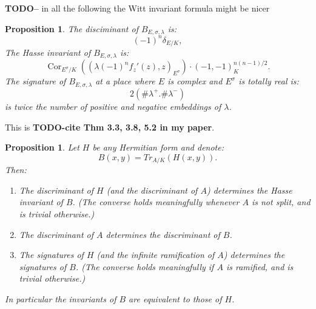 \documentclass{article}
\theoremstyle{plain}
\newtheorem{proposition}[theorem]{Proposition}
\theoremstyle{definition}
\numberwithin{equation}{section}
\DeclareMathOperator{\Cor}{Cor}
\newcommand{\TODO}[1]{\textbf{TODO-#1}}
\begin{document}
\TODO - in all the following the Witt invariant formula might be nicer

\begin{proposition}\label{prop:Hasse}
The disciminant of $B_{E,\sigma,\lambda}$ is:
\[  (-1)^n\delta_{E/K}, \]
The Hasse invariant of $B_{E,\sigma,\lambda}$ is:
\[  \Cor_{E^\sigma/K}((\lambda (-1)^n f_z'(z), z)_{E^\sigma})\cdot(-1,-1)_K^{n(n-1)/2}.\] 
The signature of $B_{E,\sigma,\lambda}$ at a place where $E$ is complex and $E^\sigma$ is totally real is:
\[ 2(\#\lambda^+. \#\lambda^-) \]
is twice the number of positive and negative embeddings of $\lambda$.
\end{proposition}
This is \TODO{cite Thm 3.3, 3.8, 5.2 in my paper}.

\begin{proposition}\label{prop:InvariantRelations}
Let $H$ be any Hermitian form and denote:
\[ B(x,y) = Tr_{A/K}(H(x,y)). \]
Then:
\begin{enumerate}
\item The discriminant of $H$ (and the discriminant of $A$) determines the Hasse invariant of $B$. (The converse holds meaningfully whenever $A$ is not split, and is trivial otherwise.)
\item The discriminant of $A$ determines the discriminant of $B$.
\item The signatures of $H$ (and the infinite ramification of $A$) determines the signatures of $B$. (The converse holds meaningfully if $A$ is ramified, and is trivial otherwise.)
\end{enumerate}
In particular the invariants of $B$ are equivalent to those of $H$.
\end{proposition}
\end{document}
